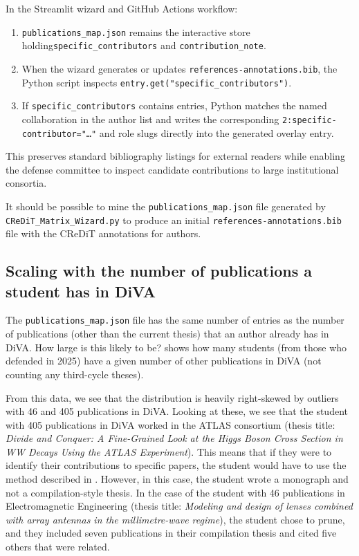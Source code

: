 \documentclass[12pt, twoside]{article}
\newcommand{\fname}[1]{\texttt{#1}}
\begin{document}
In the Streamlit wizard and GitHub Actions workflow:
\begin{enumerate}
    \item \fname{publications\_map.json} remains the interactive store holding\linebreak[4] \texttt{specific\_contributors} and \texttt{contribution\_note}.
    
    \item When the wizard generates or updates \fname{references-annotations.bib}, the Python script inspects \texttt{entry.get("specific\_contributors")}.
    
    \item If \texttt{specific\_contributors} contains entries, Python matches the named collaboration in the author list and writes the corresponding \texttt{2:specific-contributor="\ldots"} and role slugs directly into the generated overlay entry.
\end{enumerate}

This preserves standard bibliography listings for external readers while enabling the defense committee to inspect candidate contributions to large institutional consortia.

It should be possible to mine the \fname{publications\_map.json} file generated by \fname{CReDiT\_Matrix\_Wizard.py} to produce an initial \fname{references-annotations.bib} file with the \gls{CReDiT} annotations for authors.

\subsection{Scaling with the number of publications a student has in DiVA}
The \fname{publications\_map.json} file has the same number of entries as the number of publications (other than the current thesis) that an author already has in \gls{DiVA}. How large is this likely to be?  shows how many students (from those who defended in 2025) have a given number of other publications in \gls{DiVA} (\ie not counting any third-cycle theses).

From this data, we see that the distribution is heavily right-skewed by outliers with 46 and 405 publications in \gls{DiVA}. Looking at these, we see that the student with 405 publications in \gls{DiVA} worked in the ATLAS consortium (thesis title: \textit{Divide and Conquer: A Fine-Grained Look at the Higgs Boson Cross Section in WW Decays Using the ATLAS Experiment}). This means that if they were to identify their contributions to specific papers, the student would have to use the method described in . However, in this case, the student wrote a monograph and not a compilation-style thesis.
In the case of the student with 46 publications in Electromagnetic Engineering (thesis title: \textit{Modeling and design of lenses combined with array antennas in the \mbox{millimetre-wave} regime}), the student chose to prune, and they included seven publications in their compilation thesis and cited five others that were related.
\end{document}
